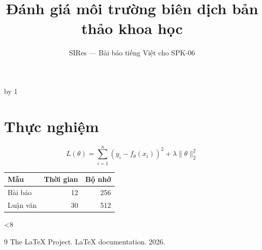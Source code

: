 \documentclass[11pt]{article}
\title{Đánh giá môi trường biên dịch bản thảo khoa học}
\author{SIRes — Bài báo tiếng Việt cho SPK-06}
\date{}
\begin{document}
\maketitle
\begin{abstract}\sampleparagraph\end{abstract}
\tableofcontents
\newcount\sectionnumber
{}
\loop
  \advance\sectionnumber by 1
  \section{Thực nghiệm \the\sectionnumber}
  \sampleparagraph\sampleparagraph\sampleparagraph
  \begin{equation}\label{eq:\the\sectionnumber}
    L(\theta)=\sum_{i=1}^{n}(y_i-f_\theta(x_i))^2+\lambda\|\theta\|_2^2
  \end{equation}
  \begin{center}
    \begin{tabular}{lrr}\toprule Mẫu & Thời gian & Bộ nhớ \\
      \midrule Bài báo & 12 & 256 \\ Luận văn & 30 & 512 \\ \bottomrule
    \end{tabular}
  \end{center}
\ifnum\sectionnumber<8\repeat
\begin{thebibliography}{9}
 The LaTeX Project. LaTeX documentation. 2026.
\end{thebibliography}
\end{document}

